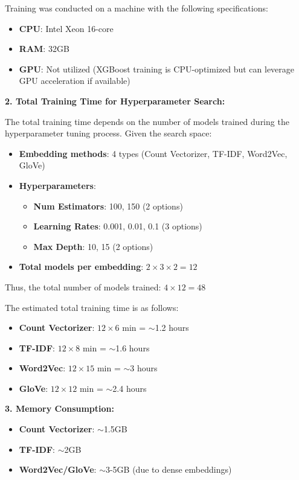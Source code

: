 Training was conducted on a machine with the following specifications:

\begin{itemize}
\item \textbf{CPU}: Intel Xeon 16-core
\item \textbf{RAM}: 32GB
\item \textbf{GPU}: Not utilized (XGBoost training is CPU-optimized but can leverage GPU acceleration if available)
\end{itemize}

\textbf{2. Total Training Time for Hyperparameter Search:}

The total training time depends on the number of models trained during the hyperparameter tuning process. Given the search space:

\begin{itemize}
\item \textbf{Embedding methods}: 4 types (Count Vectorizer, TF-IDF, Word2Vec, GloVe)
\item \textbf{Hyperparameters}:
\begin{itemize}
\item \textbf{Num Estimators}: 100, 150 (2 options)
\item \textbf{Learning Rates}: 0.001, 0.01, 0.1 (3 options)
\item \textbf{Max Depth}: 10, 15 (2 options)
\end{itemize}
\item \textbf{Total models per embedding}: $2 \times 3 \times 2 = 12$
\end{itemize}

Thus, the total number of models trained: $4 \times 12 = 48$

The estimated total training time is as follows:

\begin{itemize} 
    \item \textbf{Count Vectorizer}: $12 \times 6$ min = $\sim$1.2 hours
    \item \textbf{TF-IDF}: $12 \times 8$ min = $\sim$1.6 hours
    \item \textbf{Word2Vec}: $12 \times 15$ min = $\sim$3 hours
    \item \textbf{GloVe}: $12 \times 12$ min = $\sim$2.4 hours
\end{itemize}

\textbf{3. Memory Consumption:}

\begin{itemize} 
\item \textbf{Count Vectorizer}: $\sim$1.5GB
\item \textbf{TF-IDF}: $\sim$2GB
\item \textbf{Word2Vec/GloVe}: $\sim$3-5GB (due to dense embeddings)
\end{itemize} 

